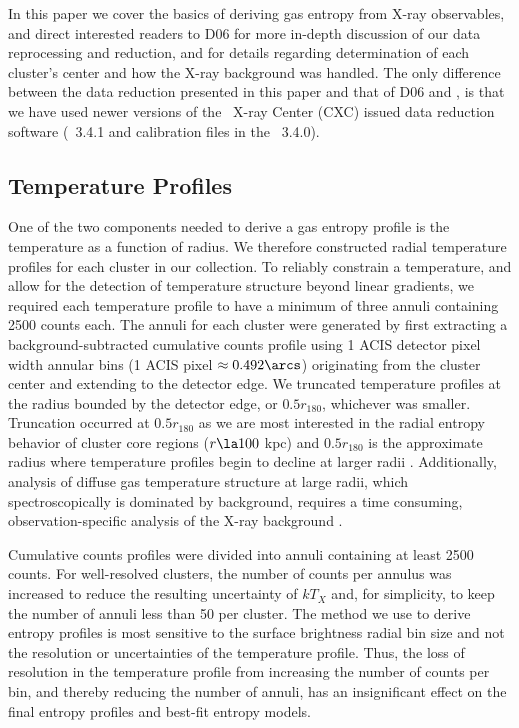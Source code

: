 \documentclass{emulateapj}
\begin{document}
In this paper we cover the basics of deriving gas entropy from X-ray
observables, and direct interested readers to D06 for more in-depth
discussion of our data reprocessing and reduction, and
\citet{xrayband} for details regarding determination of each cluster's
center and how the X-ray background was handled. The only difference
between the data reduction presented in this paper and that of D06 and
\citet{xrayband}, is that we have used newer versions of the \chandra\
X-ray Center (CXC) issued data reduction software (\ciao\ 3.4.1 and
calibration files in the \caldb\ 3.4.0).

\subsection{Temperature Profiles}
\label{sec:temppr}

One of the two components needed to derive a gas entropy profile is
the temperature as a function of radius. We therefore constructed
radial temperature profiles for each cluster in our collection. To
reliably constrain a temperature, and allow for the detection of
temperature structure beyond linear gradients, we required each
temperature profile to have a minimum of three annuli containing 2500
counts each. The annuli for each cluster were generated by first
extracting a background-subtracted cumulative counts profile using 1
ACIS detector pixel width annular bins (1 ACIS pixel $\approx
0.492\arcs$) originating from the cluster center and extending to the
detector edge. We truncated temperature profiles at the radius bounded
by the detector edge, or $0.5 r_{180}$, whichever was
smaller. Truncation occurred at $0.5 r_{180}$ as we are most
interested in the radial entropy behavior of cluster core regions ($r
\la 100$ kpc) and $0.5 r_{180}$ is the approximate radius where
temperature profiles begin to decline at larger radii
\citep{2005ApJ...628..655V}.  Additionally, analysis of diffuse gas
temperature structure at large radii, which spectroscopically is
dominated by background, requires a time consuming,
observation-specific analysis of the X-ray background \cite[see][for a
  detailed discussion on this point]{minggroups}.

Cumulative counts profiles were divided into annuli containing at
least 2500 counts. For well-resolved clusters, the number of counts
per annulus was increased to reduce the resulting uncertainty of
$kT_X$ and, for simplicity, to keep the number of annuli less than 50
per cluster. The method we use to derive entropy profiles is most
sensitive to the surface brightness radial bin size and not the
resolution or uncertainties of the temperature profile. Thus, the loss
of resolution in the temperature profile from increasing the number of
counts per bin, and thereby reducing the number of annuli, has an
insignificant effect on the final entropy profiles and best-fit
entropy models.
\end{document}
